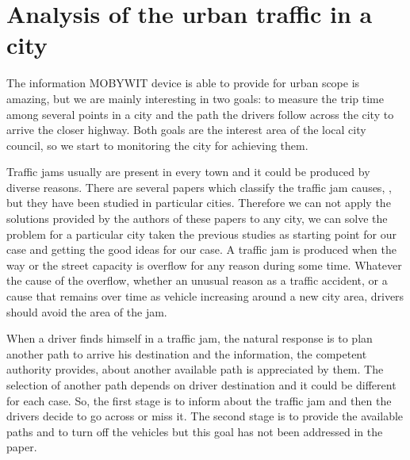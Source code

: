 \documentclass[preprint]{elsarticle}
\begin{document}





\section{Analysis of the urban traffic in a city}
\label{sec:city}

The information MOBYWIT device is able to provide for urban scope is amazing, but we are mainly interesting in two goals: to measure the trip time among several points in a city and the path the drivers follow across the city to arrive the closer highway. Both goals are the interest area of the local city council, so we start to monitoring the city for achieving them. 

Traffic jams usually are present in every town and it could be produced by diverse reasons. There are several papers which classify the traffic jam causes, \cite{CausasAtascos1}\cite{CausasAtascos2}, but they have been studied in particular cities. Therefore we can not apply the solutions provided by the authors of these papers to any city, we can solve the problem for a particular city taken the previous studies as starting point for our case and getting the good ideas for our case. A traffic jam is produced when the way or the street capacity is overflow for any reason during some time. Whatever the cause of the overflow, whether an unusual reason as a traffic accident, or a cause that remains over time as vehicle increasing around a new city area, drivers should avoid the area of the jam.


When a driver finds himself in a traffic jam, the natural response is to plan another path to arrive his destination and the information, the competent authority provides, about another available path is appreciated by them. The selection of another path depends on driver destination and it could be different for each case. So, the first stage is to inform about the traffic jam and then the drivers decide to go across or miss it. The second stage is to provide the available paths and to turn off the vehicles but this goal has not been addressed in the paper. 
\end{document}
